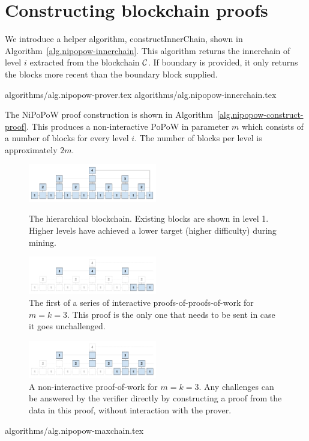 \section{Constructing blockchain proofs}

We introduce a helper algorithm, constructInnerChain, shown in
Algorithm~\ref{alg.nipopow-innerchain}. This algorithm returns the innerchain
of level $i$ extracted from the blockchain $\mathcal{C}$. If boundary is provided,
it only returns the blocks more recent than the boundary block supplied.

{algorithms/alg.nipopow-prover.tex}
{algorithms/alg.nipopow-innerchain.tex}

The NiPoPoW proof construction is shown in Algorithm~\ref{alg.nipopow-construct-proof}.
This produces a non-interactive PoPoW in parameter $m$ which consists of a
number of blocks for every level $i$. The number of blocks per level is
approximately $2m$.

\begin{figure}[h]
    \caption{The hierarchical blockchain. Existing blocks are shown in level 1.
    Higher levels have achieved a lower target (higher difficulty) during mining.}
    \centering
    \includegraphics[width=0.5\textwidth,keepaspectratio]{figures/hierarchical-ledger.png}
    \label{fig:hierarchy}
\end{figure}

\begin{figure}[h]
    \caption{The first of a series of interactive proofs-of-proofs-of-work for
    $m = k = 3$. This proof is the only one that needs to be sent in case it
    goes unchallenged.}
    \centering
    \includegraphics[width=0.5\textwidth,keepaspectratio]{figures/interactive-popow.png}
\end{figure}

\begin{figure}[h]
    \caption{A non-interactive proof-of-work for $m = k = 3$. Any challenges
    can be answered by the verifier directly by constructing a proof from the
    data in this proof, without interaction with the prover.}
    \centering
    \includegraphics[width=0.5\textwidth,keepaspectratio]{figures/non-interactive-popow.png}
\end{figure}

{algorithms/alg.nipopow-maxchain.tex}
